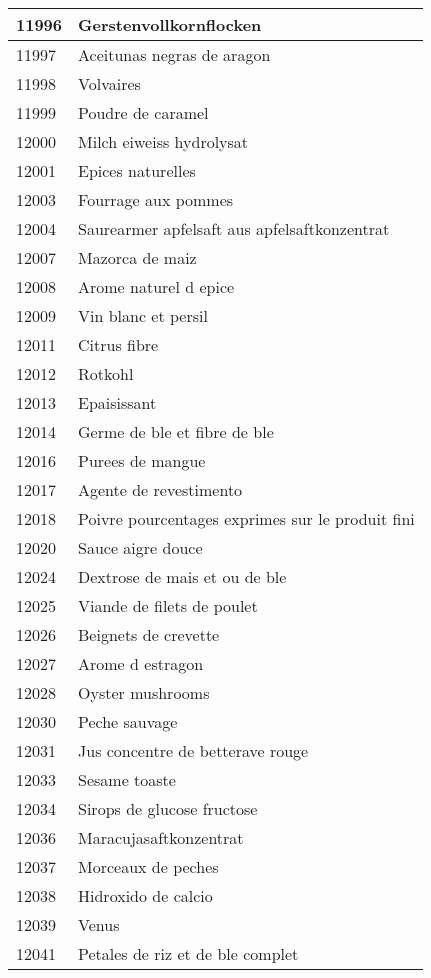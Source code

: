 \begin{longtable}{|l|l|}
11996 & Gerstenvollkornflocken \\ \hline 
11997 & Aceitunas negras de aragon \\ \hline 
11998 & Volvaires \\ \hline 
11999 & Poudre de caramel \\ \hline 
12000 & Milch eiweiss hydrolysat \\ \hline 
12001 & Epices naturelles \\ \hline 
12003 & Fourrage aux pommes \\ \hline 
12004 & Saurearmer apfelsaft aus apfelsaftkonzentrat \\ \hline 
12007 & Mazorca de maiz \\ \hline 
12008 & Arome naturel d epice \\ \hline 
12009 & Vin blanc et persil \\ \hline 
12011 & Citrus fibre \\ \hline 
12012 & Rotkohl \\ \hline 
12013 & Epaisissant \\ \hline 
12014 & Germe de ble et fibre de ble \\ \hline 
12016 & Purees de mangue \\ \hline 
12017 & Agente de revestimento \\ \hline 
12018 & Poivre pourcentages exprimes sur le produit fini \\ \hline 
12020 & Sauce aigre douce \\ \hline 
12024 & Dextrose de mais et ou de ble \\ \hline 
12025 & Viande de filets de poulet \\ \hline 
12026 & Beignets de crevette \\ \hline 
12027 & Arome d estragon \\ \hline 
12028 & Oyster mushrooms \\ \hline 
12030 & Peche sauvage \\ \hline 
12031 & Jus concentre de betterave rouge \\ \hline 
12033 & Sesame toaste \\ \hline 
12034 & Sirops de glucose fructose \\ \hline 
12036 & Maracujasaftkonzentrat \\ \hline 
12037 & Morceaux de peches \\ \hline 
12038 & Hidroxido de calcio \\ \hline 
12039 & Venus \\ \hline 
12041 & Petales de riz et de ble complet \\ \hline 

\end{longtable}
